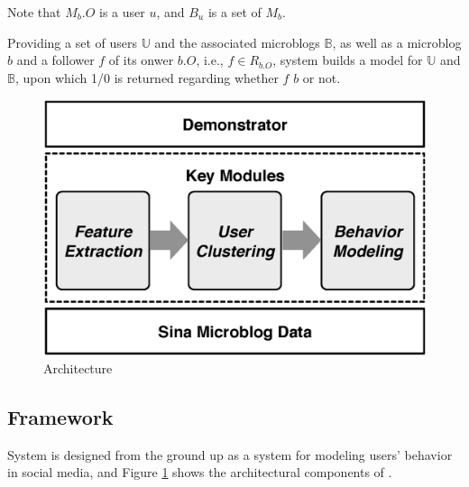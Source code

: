 Note that $M_b.O$ is a user $u$, and $B_u$ is a set of $M_b$.


Providing a set of users $\mathbb{U}$ and the associated microblogs $\mathbb{B}$, as well as a microblog $b$ and a follower $f$ of its onwer $b.O$, i.e., $f \in R_{b.O}$, system \sys{} builds a \retg{} model for $\mathbb{U}$ and $\mathbb{B}$, upon which 1/0 is returned regarding whether $f$  $b$ or not.

\begin{figure}[tb!]
\centering
\includegraphics[width=.7\linewidth]{figures/architecture.eps}
\vspace{-1ex}
\caption{\sys{} Architecture}
\label{fig:framework}
\vspace{-2ex}
\end{figure}



\subsection{\sys{} Framework}
System \sys{} is designed from the ground up as a system for modeling users' \retg{} behavior in social media, and
Figure \ref{fig:framework} shows the architectural components of \sys{}. %

